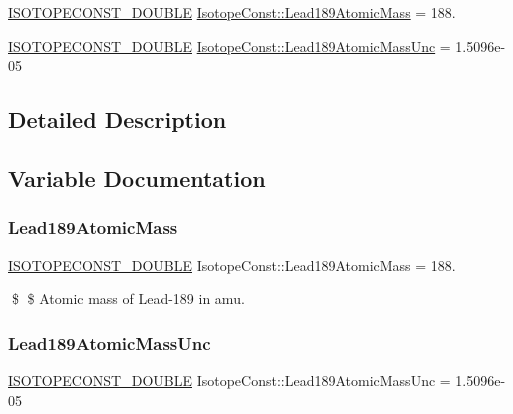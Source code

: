 \begin{DoxyCompactItemize}
\item 
\mbox{\hyperlink{group___isotope_const-_macros_ga8f45a7272ce02c0b4c65c44636ed719a}{I\+S\+O\+T\+O\+P\+E\+C\+O\+N\+S\+T\+\_\+\+D\+O\+U\+B\+LE}} \mbox{\hyperlink{group___isotope_const-_lead-_pb189_ga9796bfeeaffe40d5aa5c4481beea005e}{Isotope\+Const\+::\+Lead189\+Atomic\+Mass}} = 188.
\item 
\mbox{\hyperlink{group___isotope_const-_macros_ga8f45a7272ce02c0b4c65c44636ed719a}{I\+S\+O\+T\+O\+P\+E\+C\+O\+N\+S\+T\+\_\+\+D\+O\+U\+B\+LE}} \mbox{\hyperlink{group___isotope_const-_lead-_pb189_ga07138a5297760a1c03b90ca1069459fe}{Isotope\+Const\+::\+Lead189\+Atomic\+Mass\+Unc}} = 1.\+5096e-\/05
\end{DoxyCompactItemize}


\subsection{Detailed Description}


\subsection{Variable Documentation}
\mbox{\label{group___isotope_const-_lead-_pb189_ga9796bfeeaffe40d5aa5c4481beea005e}} 
\subsubsection{\texorpdfstring{Lead189\+Atomic\+Mass}{Lead189AtomicMass}}
{\footnotesize\ttfamily \mbox{\hyperlink{group___isotope_const-_macros_ga8f45a7272ce02c0b4c65c44636ed719a}{I\+S\+O\+T\+O\+P\+E\+C\+O\+N\+S\+T\+\_\+\+D\+O\+U\+B\+LE}} Isotope\+Const\+::\+Lead189\+Atomic\+Mass = 188.}

\$ \$ Atomic mass of Lead-\/189 in amu. \mbox{\label{group___isotope_const-_lead-_pb189_ga07138a5297760a1c03b90ca1069459fe}} 
\subsubsection{\texorpdfstring{Lead189\+Atomic\+Mass\+Unc}{Lead189AtomicMassUnc}}
{\footnotesize\ttfamily \mbox{\hyperlink{group___isotope_const-_macros_ga8f45a7272ce02c0b4c65c44636ed719a}{I\+S\+O\+T\+O\+P\+E\+C\+O\+N\+S\+T\+\_\+\+D\+O\+U\+B\+LE}} Isotope\+Const\+::\+Lead189\+Atomic\+Mass\+Unc = 1.\+5096e-\/05}

